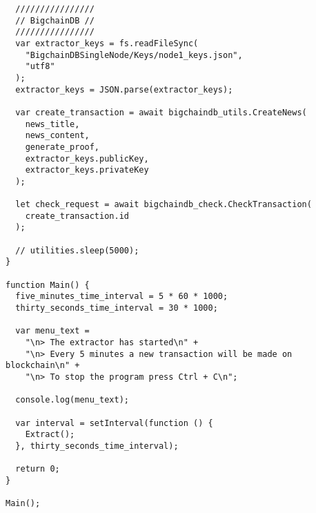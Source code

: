 \begin{verbatim}
  ////////////////
  // BigchainDB //
  ////////////////
  var extractor_keys = fs.readFileSync(
    "BigchainDBSingleNode/Keys/node1_keys.json",
    "utf8"
  );
  extractor_keys = JSON.parse(extractor_keys);

  var create_transaction = await bigchaindb_utils.CreateNews(
    news_title,
    news_content,
    generate_proof,
    extractor_keys.publicKey,
    extractor_keys.privateKey
  );

  let check_request = await bigchaindb_check.CheckTransaction(
    create_transaction.id
  );

  // utilities.sleep(5000);
}

function Main() {
  five_minutes_time_interval = 5 * 60 * 1000;
  thirty_seconds_time_interval = 30 * 1000;

  var menu_text =
    "\n> The extractor has started\n" +
    "\n> Every 5 minutes a new transaction will be made on blockchain\n" +
    "\n> To stop the program press Ctrl + C\n";

  console.log(menu_text);

  var interval = setInterval(function () {
    Extract();
  }, thirty_seconds_time_interval);

  return 0;
}

Main();
\end{verbatim}